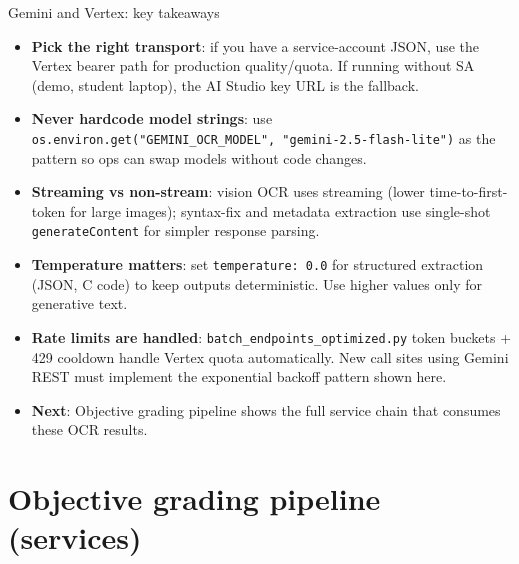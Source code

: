 \documentclass[aspectratio=169]{beamer}
\begin{document}
\begin{frame}{Gemini and Vertex: key takeaways}
  \small
  \begin{itemize}\setlength\itemsep{0.3em}
    \item \textbf{Pick the right transport}: if you have a service-account JSON, use the Vertex bearer path for production quality/quota. If running without SA (demo, student laptop), the AI Studio key URL is the fallback.
    \item \textbf{Never hardcode model strings}: use \texttt{os.environ.get("GEMINI\_OCR\_MODEL", "gemini-2.5-flash-lite")} as the pattern so ops can swap models without code changes.
    \item \textbf{Streaming vs non-stream}: vision OCR uses streaming (lower time-to-first-token for large images); syntax-fix and metadata extraction use single-shot \texttt{generateContent} for simpler response parsing.
    \item \textbf{Temperature matters}: set \texttt{temperature: 0.0} for structured extraction (JSON, C code) to keep outputs deterministic. Use higher values only for generative text.
    \item \textbf{Rate limits are handled}: \texttt{batch\_endpoints\_optimized.py} token buckets + 429 cooldown handle Vertex quota automatically. New call sites using Gemini REST must implement the exponential backoff pattern shown here.
    \item \textbf{Next}: Objective grading pipeline shows the full service chain that consumes these OCR results.
  \end{itemize}
\end{frame}

\section{Objective grading pipeline (services)}
\end{document}
